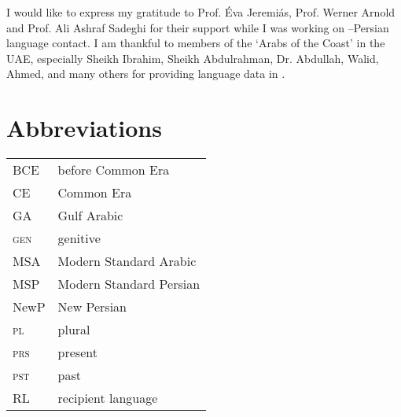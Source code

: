 \documentclass[output=paper]{langsci/langscibook}
\begin{document}
I would like to express my gratitude to Prof. Éva Jeremiás, Prof. Werner Arnold and Prof. Ali Ashraf Sadeghi for their support while I was working on –Persian language contact. I am thankful to members of the ‘Arabs of the Coast’ in the UAE, especially Sheikh Ibrahim, Sheikh Abdulrahman, Dr. Abdullah, Walid, Ahmed, and many others for providing language data in .

\section*{Abbreviations}
\begin{tabularx}{.5\textwidth}{@{}lQ@{}}
BCE & before Common Era\\
CE & Common Era\\
GA & Gulf {Arabic}\\
\textsc{gen}   &  genitive\\
{MSA} &  Modern Standard {Arabic}\\
{MSP}  &  Modern Standard Persian\\
NewP   &  {New Persian}\\
\textsc{pl}   &  plural\\
\textsc{prs}   &  present\\
\textsc{pst}   &  past\\
{RL} &  {recipient language} \\
\end{tabularx}%



{\sloppy\printbibliography[heading=subbibliography,notkeyword=this]}
\end{document}
